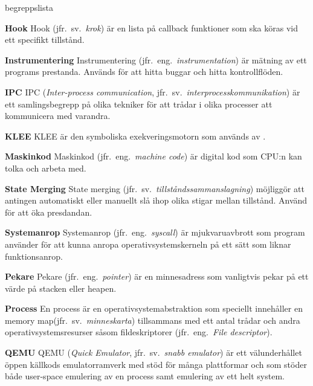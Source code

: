 \begin{labeling}{begreppslista}
    \item [\textbf{Hook}] Hook (jfr.\ sv.\ \emph{krok}) är en lista på callback
    funktioner som ska köras vid ett specifikt tillstånd.

    \item [\textbf{Instrumentering}] Instrumentering (jfr.\ eng.\
    \emph{instrumentation}) är mätning av ett programs prestanda. Används för
    att hitta buggar och hitta kontrollflöden.

    \item [\textbf{IPC}] IPC (\emph{Inter-process communication}, jfr.\ sv.\
    \emph{interprocesskommunikation}) är ett samlingsbegrepp på olika tekniker
    för att trådar i olika processer att kommunicera med varandra.

    \item [\textbf{KLEE}] KLEE är den symboliska exekveringsmotorn som används
    av \stoe{}.

    \item [\textbf{Maskinkod}] Maskinkod (jfr.\ eng.\ \emph{machine code}) är
    digital kod som CPU:n kan tolka och arbeta med.

    \item [\textbf{State Merging}] State merging (jfr.\ sv.\
    \emph{tillståndssammanslagning}) möjliggör att antingen automatiskt
    eller manuellt slå ihop olika stigar mellan tillstånd. Använd för att öka
    presdandan.

    \item [\textbf{Systemanrop}] Systemanrop (jfr.\ eng.\ \emph{syscall}) är
    mjukvaruavbrott som program använder för att kunna anropa
    operativsystemskerneln på ett sätt som liknar funktionsanrop.

    \item [\textbf{Pekare}] Pekare (jfr.\ eng.\ \emph{pointer}) är en minnesadress som
    vanligtvis pekar på ett värde på stacken eller heapen.

    \item [\textbf{Process}] En process är en
    operativsystemabstraktion som speciellt innehåller en memory
    map(jfr.\ sv.\ \emph{minneskarta}) tillsammans med ett antal trådar och
    andra operativsystemsresurser såsom fildeskriptorer (jfr.\
    eng.\ \emph{File descriptor}).

    \item [\textbf{QEMU}] QEMU (\emph{Quick Emulator}, jfr.\ sv.\ \emph{snabb
        emulator}) är ett välunderhållet öppen källkods emulatorramverk
    med stöd för många plattformar och som stöder både user-space
    emulering av en process samt emulering av ett helt system.


\end{labeling}
